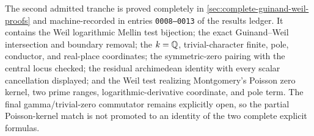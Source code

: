 The second admitted tranche is proved completely in
\cref{sec:complete-guinand-weil-proofs} and machine-recorded in entries
\texttt{0008--0013} of the results ledger.  It contains the
Weil logarithmic Mellin test bijection; the exact Guinand--Weil intersection and boundary
removal; the $k=\mathbb{Q}$, trivial-character finite, pole, conductor, and real-place coordinates;
the symmetric-zero pairing with the central locus checked; the residual archimedean identity
with every scalar cancellation displayed; and the Weil test realizing Montgomery's Poisson
zero kernel, two prime ranges, logarithmic-derivative coordinate, and pole term.  The final
gamma/trivial-zero commutator remains explicitly open, so the partial Poisson-kernel match is
not promoted to an identity of the two complete explicit formulas.
